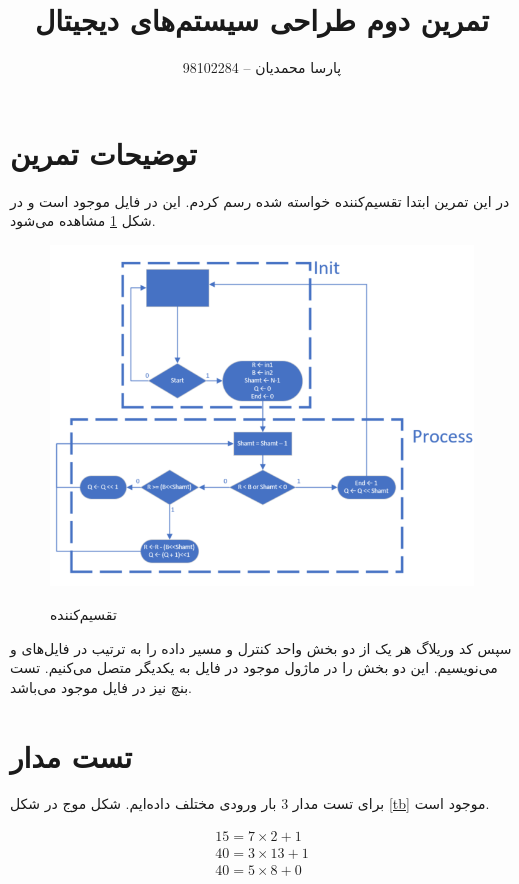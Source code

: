 \documentclass{article}
\title{تمرین دوم طراحی سیستم‌های دیجیتال}
\author{پارسا محمدیان -- 98102284}
\begin{document}
\maketitle
\newpage

\section{توضیحات تمرین}
در این تمرین ابتدا 
تقسیم‌کننده خواسته شده رسم کردم. این 
در فایل 
موجود است و در شکل 
\ref{asm}
مشاهده می‌شود.

\begin{figure}[!htbp]
    \centering
    \includegraphics[width=\linewidth]{ASM.png}
    \label{asm}
    \caption{ تقسیم‌کننده}
\end{figure}

سپس کد وریلاگ هر یک از دو بخش واحد کنترل و مسیر داده را به ترتیب در فایل‌های 
و
می‌نویسیم. این دو بخش را در ماژول موجود در فایل 
به یکدیگر متصل می‌کنیم. تست بنچ نیز در فایل 
موجود می‌باشد. 

\section{تست مدار}
برای تست مدار 3 بار ورودی مختلف داده‌ایم. شکل موج در شکل 
\ref{tb}
موجود است.

\begin{gather*}
    15 = 7 \times 2 + 1 \\
    40 = 3 \times 13 + 1 \\
    40 = 5 \times 8 + 0
\end{gather*}
\end{document}
